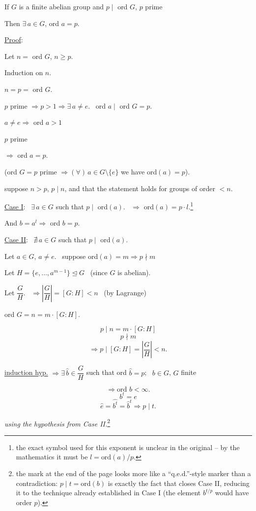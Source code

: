 \documentclass[12pt]{article}
\begin{document}
\begin{center}
\end{center}

\bigskip
\noindent If $G$ is a finite abelian group and $p\mid$ ord $G$, $p$ prime

\noindent Then $\exists\, a\in G$, ord $a=p$.

\bigskip
\noindent\underline{Proof}:

\noindent Let $n=$ ord $G$, $n\geq p$.

\noindent Induction on $n$.

\bigskip
\noindent $n=p=$ ord $G$.

\noindent $p$ prime $\Rightarrow p>1 \Rightarrow \exists\, a\neq e$. \ ord $a\mid$ ord $G=p$.

\noindent $a\neq e \Rightarrow$ ord $a>1$

\noindent $p$ prime

\noindent $\Rightarrow$ ord $a=p$.

\bigskip
\noindent\big(ord $G=p$ prime $\Rightarrow (\forall)\,a\in G\setminus\{e\}$ we have ord$(a)=p$\big).

\bigskip
\noindent suppose $n>p$, $p\mid n$, and that the statement holds for groups of order $<n$.

\bigskip
\noindent\underline{Case I}: \ $\exists\, a\in G$ such that $p\mid$ ord$(a)$. \ $\Rightarrow$ ord$(a)=p\cdot l$.\footnote{the exact symbol used for this exponent is unclear in the original -- by the mathematics it must be $l=\text{ord}(a)/p$.}

\noindent And $b=a^l \Rightarrow$ ord $b=p$.

\bigskip
\noindent\underline{Case II}: \ $\nexists\, a\in G$ such that $p\mid$ ord$(a)$.

\bigskip
\noindent Let $a\in G$, $a\neq e$. \ suppose ord$(a)=m \Rightarrow p\nmid m$

\noindent Let $H=\{e,\ldots,a^{m-1}\}\trianglelefteq G$ \ (since $G$ is abelian).

\noindent Let $\dfrac{G}{H}$. \ $\Rightarrow \left|\dfrac{G}{H}\right| = [G:H] < n$ \ (by Lagrange)

\bigskip
\noindent ord $G = n = m\cdot[G:H]$.

\[
p\mid n = m\cdot[G:H]
\]
\[
p\nmid m
\]
\[
\Rightarrow p\mid [G:H] = \left|\dfrac{G}{H}\right| < n.
\]

\bigskip
\noindent\underline{induction hyp.} $\Rightarrow \exists\, \hat b\in \dfrac{G}{H}$ such that ord $\hat b=p$; \ $b\in G$, $G$ finite

\[
\Rightarrow \text{ord } b<\infty.
\]
\[
b^t=e
\]
\[
\hat e=\widehat{b^t}=\hat b^t \Rightarrow p\mid t.
\]

\noindent\textit{using the hypothesis from Case II.}\footnote{the mark at the end of the page looks more like a ``q.e.d.''-style marker than a contradiction: $p\mid t=\text{ord}(b)$ is exactly the fact that closes Case II, reducing it to the technique already established in Case I (the element $b^{t/p}$ would have order $p$).}
\end{document}

